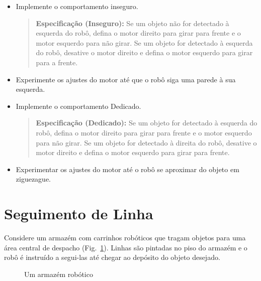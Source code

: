 \begin{framed}
\begin{itemize}
\item Implemente o comportamento inseguro.
\begin{quote}
\normalsize\noindent\textbf{Especificação (Inseguro):} Se um objeto não for detectado à esquerda do robô, defina o motor direito para girar para frente e o motor esquerdo para não girar. Se um objeto for detectado à esquerda do robô, desative o motor direito e defina o motor esquerdo para girar para a frente.
\end{quote}
\item Experimente os ajustes do motor até que o robô siga uma parede à sua esquerda.
\end{itemize}
\end{framed}

\begin{framed}
\begin{itemize}
\item Implemente o comportamento Dedicado.
\begin{quote}
\normalsize\noindent\textbf{Especificação (Dedicado):} Se um objeto for detectado à esquerda do robô, defina o motor direito para girar para frente e o motor esquerdo para não girar. Se um objeto for detectado à direita do robô, desative o motor direito e defina o motor esquerdo para girar para frente.
\end{quote}
\item Experimentar os ajustes do motor até o robô se aproximar do objeto em ziguezague.
\end{itemize}
\end{framed}

\section{Seguimento de Linha}\label{s.line}

Considere um armazém com carrinhos robóticos que tragam objetos para uma área central de despacho (Fig.~\ref{fig.warehouse}). Linhas são pintadas no piso do armazém e o robô é instruído a segui-las até chegar ao depósito do objeto desejado.

\begin{figure}
\begin{center}
\caption{Um armazém robótico}\label{fig.warehouse}
\end{center}
\end{figure}

